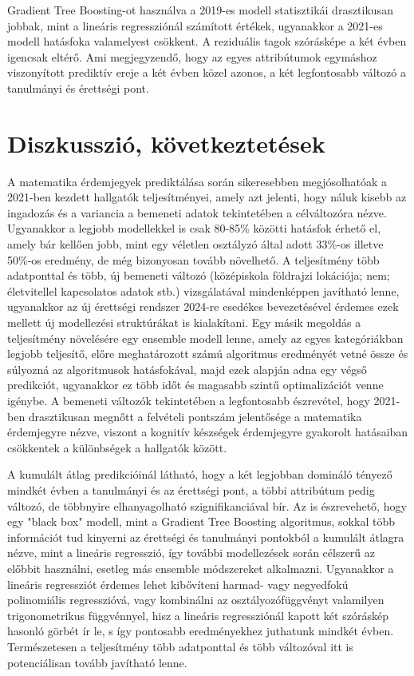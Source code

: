 \documentclass[12pt]{article}
\begin{document}
\noindent Gradient Tree Boosting-ot használva a 2019-es modell statisztikái drasztikusan jobbak, mint a lineáris regressziónál számított értékek, ugyanakkor a 2021-es modell hatásfoka valamelyest csökkent. A reziduális tagok szórásképe a két évben igencsak eltérő. Ami megjegyzendő, hogy az egyes attribútumok egymáshoz viszonyított prediktív ereje a két évben közel azonos, a két legfontosabb változó a tanulmányi és érettségi pont. 

\newpage 

\section{Diszkusszió, következtetések}

A matematika érdemjegyek prediktálása során sikeresebben megjósolhatóak a 2021-ben kezdett hallgatók teljesítményei, amely azt jelenti, hogy náluk kisebb az ingadozás és a variancia a bemeneti adatok tekintetében a célváltozóra nézve. Ugyanakkor a legjobb modellekkel is csak 80-85\% közötti hatásfok érhető el, amely bár kellően jobb, mint egy véletlen osztályzó által adott 33\%-os illetve 50\%-os eredmény, de még bizonyosan tovább növelhető. A teljesítmény több adatponttal és több, új bemeneti változó (középiskola földrajzi lokációja; nem; életvitellel kapcsolatos adatok stb.) vizsgálatával mindenképpen javítható lenne, ugyanakkor az új érettségi rendszer 2024-re esedékes bevezetésével érdemes ezek mellett új modellezési struktúrákat is kialakítani. Egy másik megoldás a teljesítmény növelésére egy ensemble modell lenne, amely az egyes kategóriákban legjobb teljesítő, előre meghatározott számú algoritmus eredményét vetné össze és súlyozná az algoritmusok hatásfokával, majd ezek alapján adna egy végső predikciót, ugyanakkor ez több időt és magasabb szintű optimalizációt venne igénybe. A bemeneti változók tekintetében a legfontosabb észrevétel, hogy 2021-ben drasztikusan megnőtt a felvételi pontszám jelentősége a matematika érdemjegyre nézve, viszont a kognitív készségek érdemjegyre gyakorolt hatásaiban csökkentek a különbségek a hallgatók között.

A kumulált átlag predikcióinál látható, hogy a két legjobban domináló tényező mindkét évben a tanulmányi és az érettségi pont, a többi attribútum pedig változó, de többnyire elhanyagolható szignifikanciával bír. Az is észrevehető, hogy egy "black box" modell, mint a Gradient Tree Boosting algoritmus, sokkal több információt tud kinyerni az érettségi és tanulmányi pontokból a kumulált átlagra nézve, mint a lineáris regresszió, így további modellezések során célszerű az előbbit használni, esetleg más ensemble módszereket alkalmazni. Ugyanakkor a lineáris regressziót érdemes lehet kibővíteni harmad- vagy negyedfokú polinomiális regresszióvá, vagy kombinálni az osztályozófüggvényt valamilyen trigonometrikus függvénnyel, hisz a lineáris regressziónál kapott két szóráskép hasonló görbét ír le, s így pontosabb eredményekhez juthatunk mindkét évben. Természetesen a teljesítmény több adatponttal és több változóval itt is potenciálisan tovább javítható lenne. 
\end{document}
